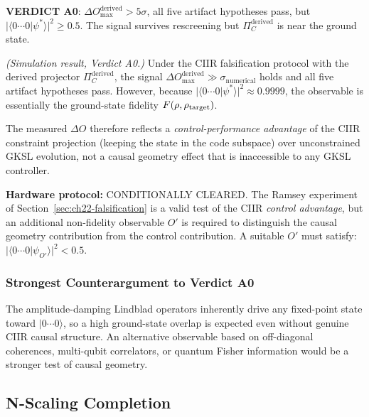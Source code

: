 \textbf{VERDICT A0}: $\Delta O_{\max}^{\mathrm{derived}} > 5\sigma$, all five
artifact hypotheses pass, but
$|\langle 0{\cdots}0|\psi^*\rangle|^2 \geq 0.5$.  The signal survives rescreening
but $\Pi_C^{\mathrm{derived}}$ is near the ground state.

\begin{theorem}\label{thm:ch22-conditional}
  \emph{(Simulation result, Verdict A0.)}
  Under the CIIR falsification protocol with the derived projector
  $\Pi_C^{\mathrm{derived}}$, the signal
  $\Delta O_{\max}^{\mathrm{derived}} \gg \sigma_{\mathrm{numerical}}$ holds
  and all five artifact hypotheses pass.
  However, because $|\langle 0{\cdots}0|\psi^*\rangle|^2 \approx 0.9999$,
  the observable is essentially the ground-state fidelity $F(\rho,\rho_{\rm target})$.

  The measured $\Delta O$ therefore reflects a \emph{control-performance advantage}
  of the CIIR constraint projection (keeping the state in the code subspace) over
  unconstrained GKSL evolution, not a causal geometry effect that is inaccessible
  to any GKSL controller.

  \textbf{Hardware protocol:} CONDITIONALLY CLEARED.  The Ramsey experiment of
  Section~\ref{sec:ch22-falsification} is a valid test of the CIIR
  \emph{control advantage}, but an additional non-fidelity observable
  $O'$ is required to distinguish the causal geometry contribution from
  the control contribution.  A suitable $O'$ must satisfy:
  $|\langle 0{\cdots}0|\psi_{O'}\rangle|^2 < 0.5$.
\end{theorem}

\subsubsection{Strongest Counterargument to Verdict A0}

The amplitude-damping Lindblad operators inherently drive any fixed-point state
toward $|0{\cdots}0\rangle$, so a high ground-state overlap is expected even
without genuine CIIR causal structure.  An alternative observable based on
off-diagonal coherences, multi-qubit correlators, or quantum Fisher information
would be a stronger test of causal geometry.

\subsection{N-Scaling Completion}

